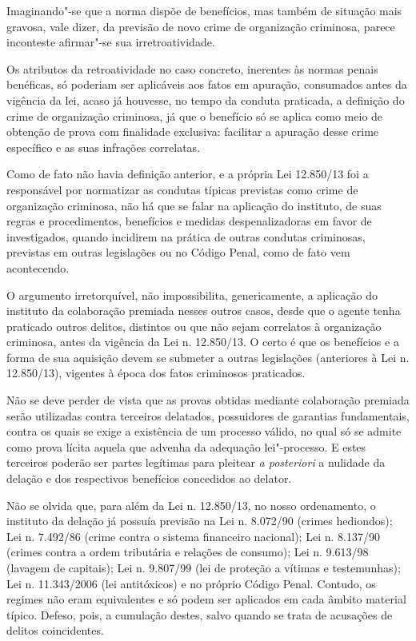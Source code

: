 Imaginando"-se que a norma dispõe de benefícios, mas também de situação
mais gravosa, vale dizer, da previsão de novo crime de organização
criminosa, parece inconteste afirmar"-se sua irretroatividade.

Os atributos da retroatividade no caso concreto, inerentes às normas
penais benéficas, só poderiam ser aplicáveis aos fatos em apuração,
consumados antes da vigência da lei, acaso já houvesse, no tempo da
conduta praticada, a definição do crime de organização criminosa, já que
o benefício só se aplica como meio de obtenção de prova com finalidade
exclusiva: facilitar a apuração desse crime específico e as suas
infrações correlatas.

Como de fato não havia definição anterior, e a própria Lei 12.850/13 foi
a responsável por normatizar as condutas típicas previstas como crime de
organização criminosa, não há que se falar na aplicação do instituto, de
suas regras e procedimentos, benefícios e medidas despenalizadoras em
favor de investigados, quando incidirem na prática de outras condutas
criminosas, previstas em outras legislações ou no Código Penal, como de
fato vem acontecendo.

O argumento irretorquível, não impossibilita, genericamente, a aplicação
do instituto da colaboração premiada nesses outros casos, desde que o
agente tenha praticado outros delitos, distintos ou que não sejam
correlatos à organização criminosa, antes da vigência da Lei n.
12.850/13. O certo é que os benefícios e a forma de sua aquisição devem
se submeter a outras legislações (anteriores à Lei n. 12.850/13),
vigentes à época dos fatos criminosos praticados.

Não se deve perder de vista que as provas obtidas mediante colaboração
premiada serão utilizadas contra terceiros delatados, possuidores de
garantias fundamentais, contra os quais se exige a existência de um
processo válido, no qual só se admite como prova lícita aquela que
advenha da adequação lei"-processo. E estes terceiros poderão ser partes
legítimas para pleitear \emph{a posteriori} a nulidade da delação e dos
respectivos benefícios concedidos ao delator.

Não se olvida que, para além da Lei n. 12.850/13, no nosso ordenamento,
o instituto da delação já possuía previsão na Lei n. 8.072/90 (crimes
hediondos); Lei n. 7.492/86 (crime contra o sistema financeiro
nacional); Lei n. 8.137/90 (crimes contra a ordem tributária e relações
de consumo); Lei n. 9.613/98 (lavagem de capitais); Lei n. 9.807/99 (lei
de proteção a vítimas e testemunhas); Lei n. 11.343/2006 (lei
antitóxicos) e no próprio Código Penal. Contudo, os regimes não eram
equivalentes e só podem ser aplicados em cada âmbito material típico.
Defeso, pois, a cumulação destes, salvo quando se trata de acusações de
delitos coincidentes.

